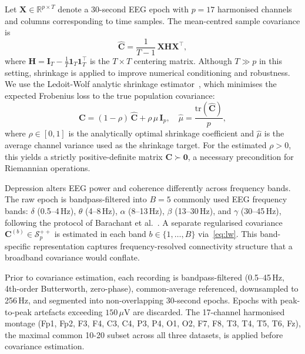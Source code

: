 Let $\mathbf{X}\in\mathbb{R}^{p\times T}$ denote a 30-second EEG epoch with
$p=17$ harmonised channels and columns corresponding to time samples.
The mean-centred sample covariance is
\begin{equation}
  \hat{\mathbf{C}} = \frac{1}{T-1}\,\mathbf{X}\mathbf{H}\mathbf{X}^\top,
  \label{eq:sample_cov}
\end{equation}
where $\mathbf{H} = \mathbf{I}_T - \frac{1}{T}\mathbf{1}_T\mathbf{1}_T^\top$
is the $T\times T$ centering matrix.
Although $T \gg p$ in this setting, shrinkage is applied to improve numerical
conditioning and robustness.
We use the Ledoit-Wolf analytic shrinkage estimator~\cite{ledoit2004wellconditioned},
which minimises the expected Frobenius loss to the true population covariance:
\begin{equation}
  \mathbf{C} = (1 - \rho)\,\hat{\mathbf{C}} + \rho\,\hat{\mu}\,\mathbf{I}_p,
  \quad \hat{\mu} = \frac{\mathrm{tr}(\hat{\mathbf{C}})}{p},
  \label{eq:lw}
\end{equation}
where $\rho\in[0,1]$ is the analytically optimal shrinkage coefficient and
$\hat{\mu}$ is the average channel variance used as the shrinkage target.
For the estimated $\rho>0$, this yields a strictly positive-definite matrix
$\mathbf{C}\succ\mathbf{0}$, a necessary precondition for Riemannian operations.

Depression alters EEG power and coherence differently across frequency bands.
The raw epoch is bandpass-filtered into $B=5$ commonly used EEG frequency bands:
$\delta$ (0.5--4\,Hz), $\theta$ (4--8\,Hz), $\alpha$ (8--13\,Hz),
$\beta$ (13--30\,Hz), and $\gamma$ (30--45\,Hz), following the protocol
of Barachant et al.~\cite{barachant2012multiclass}.
A separate regularised covariance $\mathbf{C}^{(b)}\in\mathcal{S}^{++}_p$
is estimated in each band $b\in\{1,\ldots,B\}$ via~\eqref{eq:lw}.
This band-specific representation captures frequency-resolved connectivity
structure that a broadband covariance would conflate.

Prior to covariance estimation, each recording is bandpass-filtered
(0.5--45\,Hz, 4th-order Butterworth, zero-phase), common-average referenced,
downsampled to 256\,Hz, and segmented into non-overlapping 30-second epochs.
Epochs with peak-to-peak artefacts exceeding $150\,\mu\mathrm{V}$ are discarded.
The 17-channel harmonised montage (Fp1, Fp2, F3, F4, C3, C4, P3, P4, O1, O2,
F7, F8, T3, T4, T5, T6, Fz), the maximal common 10-20 subset across all three
datasets, is applied before covariance estimation.
\label{sec:preprocessing}

